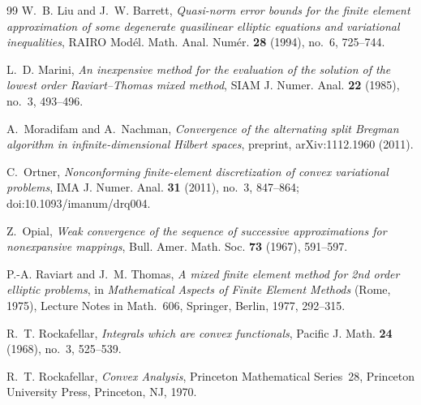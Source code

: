 \documentclass[11pt]{amsart}
\theoremstyle{definition}
\theoremstyle{remark}
\numberwithin{equation}{section}
\begin{document}
\begin{thebibliography}{99}
W.~B. Liu and J.~W. Barrett, \emph{Quasi-norm error bounds for the finite element approximation of some degenerate quasilinear elliptic equations and variational inequalities}, RAIRO Mod\'el. Math. Anal. Num\'er. \textbf{28} (1994), no.~6, 725--744.

L.~D. Marini, \emph{An inexpensive method for the evaluation of the solution of the lowest order Raviart--Thomas mixed method}, SIAM J. Numer. Anal. \textbf{22} (1985), no.~3, 493--496.

A.~Moradifam and A.~Nachman, \emph{Convergence of the alternating split Bregman algorithm in infinite-dimensional Hilbert spaces}, preprint, arXiv:1112.1960 (2011).

C.~Ortner, \emph{Nonconforming finite-element discretization of convex variational problems}, IMA J. Numer. Anal. \textbf{31} (2011), no.~3, 847--864; doi:10.1093/imanum/drq004.

Z.~Opial, \emph{Weak convergence of the sequence of successive approximations for nonexpansive mappings}, Bull. Amer. Math. Soc. \textbf{73} (1967), 591--597.

P.-A. Raviart and J.~M. Thomas, \emph{A mixed finite element method for 2nd order elliptic problems}, in \emph{Mathematical Aspects of Finite Element Methods} (Rome, 1975), Lecture Notes in Math.~606, Springer, Berlin, 1977, 292--315.

R.~T. Rockafellar, \emph{Integrals which are convex functionals}, Pacific J. Math. \textbf{24} (1968), no.~3, 525--539.

R.~T. Rockafellar, \emph{Convex Analysis}, Princeton Mathematical Series~28, Princeton University Press, Princeton, NJ, 1970.


\end{thebibliography}
\end{document}
